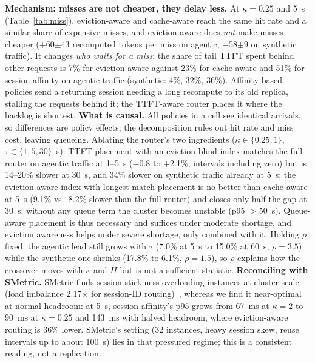 \documentclass[conference]{IEEEtran}
\begin{document}
\textbf{Mechanism: misses are not cheaper, they delay less.} At $\kappa=0.25$ and 5~s (Table~\ref{tab:miss}), eviction-aware and cache-aware reach the same hit rate and a similar share of expensive misses, and eviction-aware does \emph{not} make misses cheaper (+60$\pm$43 recomputed tokens per miss on agentic, $-$58$\pm$9 on synthetic traffic). It changes \emph{who waits for a miss}: the share of tail TTFT spent behind other requests is 7\% for eviction-aware against 23\% for cache-aware and 51\% for session affinity on agentic traffic (synthetic: 4\%, 32\%, 36\%). Affinity-based policies send a returning session needing a long recompute to its old replica, stalling the requests behind it; the TTFT-aware router places it where the backlog is shortest. \textbf{What is causal.} All policies in a cell see identical arrivals, so differences are policy effects; the decomposition rules out hit rate and miss cost, leaving queueing. Ablating the router's two ingredients ($\kappa\in\{0.25,1\}$, $\tau\in\{1,5,30\}$~s): TTFT placement with an eviction-blind index matches the full router on agentic traffic at 1--5~s ($-$0.8 to +2.1\%, intervals including zero) but is 14--20\% slower at 30~s, and 34\% slower on synthetic traffic already at 5~s; the eviction-aware index with longest-match placement is no better than cache-aware at 5~s (9.1\% vs.\ 8.2\% slower than the full router) and closes only half the gap at 30~s; without any queue term the cluster becomes unstable (p95 $>$50~s). Queue-aware placement is thus necessary and suffices under moderate shortage, and eviction awareness helps under severe shortage, only combined with it. Holding $\rho$ fixed, the agentic lead still grows with $\tau$ (7.0\% at 5~s to 15.0\% at 60~s, $\rho=3.5$) while the synthetic one shrinks (17.8\% to 6.1\%, $\rho=1.5$), so $\rho$ explains how the crossover moves with $\kappa$ and $H$ but is not a sufficient statistic. \textbf{Reconciling with SMetric.} SMetric finds session stickiness overloading instances at cluster scale (load imbalance 2.17$\times$ for session-ID routing)~\cite{r8}, whereas we find it near-optimal at normal headroom: at 5~s, session affinity's p95 grows from 67~ms at $\kappa=2$ to 90~ms at $\kappa=0.25$ and 143~ms with halved headroom, where eviction-aware routing is 36\% lower. SMetric's setting (32 instances, heavy session skew, reuse intervals up to about 100~s) lies in that pressured regime; this is a consistent reading, not a replication.
\end{document}
